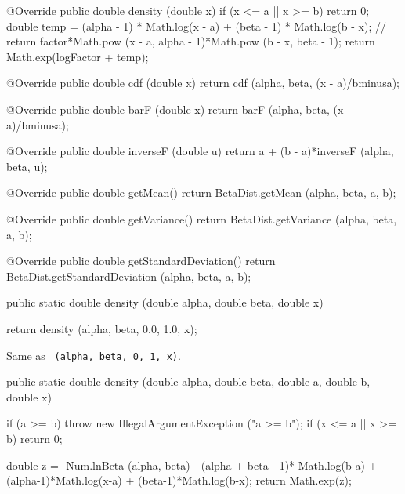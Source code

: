 \begin{code}\begin{hide}

   @Override
   public double density (double x) {
      if (x <= a || x >= b)
         return 0;
      double temp = (alpha - 1) * Math.log(x - a) + (beta - 1) * Math.log(b - x);
//      return factor*Math.pow (x - a, alpha - 1)*Math.pow (b - x, beta - 1);
      return Math.exp(logFactor + temp);
   }

   @Override
   public double cdf (double x) {
      return cdf (alpha, beta, (x - a)/bminusa);
   }

   @Override
   public double barF (double x) {
      return barF (alpha, beta, (x - a)/bminusa);
   }

   @Override
   public double inverseF (double u) {
      return a + (b - a)*inverseF (alpha, beta, u);
   }

   @Override
   public double getMean() {
      return BetaDist.getMean (alpha, beta, a, b);
   }

   @Override
   public double getVariance() {
      return BetaDist.getVariance (alpha, beta, a, b);
   }

   @Override
   public double getStandardDeviation() {
      return BetaDist.getStandardDeviation (alpha, beta, a, b);
   }\end{hide}

   public static double density (double alpha, double beta, double x)\begin{hide} {
      return density (alpha, beta, 0.0, 1.0, x);
   }\end{hide}
\end{code}
\begin{tabb} Same as
 ~\texttt{(alpha, beta, 0, 1, x)}.
\end{tabb}
\begin{code}

   public static double density (double alpha, double beta,
                                 double a, double b, double x)\begin{hide} {
      if (a >= b)
         throw new IllegalArgumentException ("a >= b");
      if (x <= a || x >= b)
         return 0;

      double z = -Num.lnBeta (alpha, beta) - (alpha + beta - 1)* Math.log(b-a) +
		      (alpha-1)*Math.log(x-a) + (beta-1)*Math.log(b-x);
      return Math.exp(z);
   }\end{hide}
\end{code}
